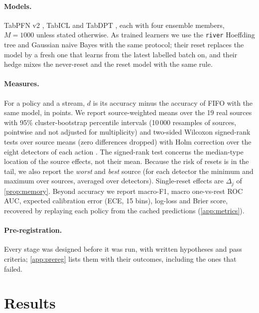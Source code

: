\documentclass[10pt]{article}
\theoremstyle{definition}
\theoremstyle{remark}
\begin{document}
\paragraph{Models.} TabPFN v2 \citep{hollmann2025tabpfn}, TabICL \citep{qu2025tabicl} and TabDPT \citep{ma2024tabdpt},
each with four ensemble members, $M=1000$ unless stated otherwise. As trained learners we use the \texttt{river}
Hoeffding tree \citep{domingos2000vfdt} and Gaussian naive Bayes with the same protocol; their reset replaces the model
by a fresh one that learns from the latest labelled batch on, and their hedge mixes the never-reset and the reset model
with the same rule.

\paragraph{Measures.} For a policy and a stream, $d$ is its accuracy minus the accuracy of FIFO with the same model,
in points. We report source-weighted means over the 19 real sources with 95\% cluster-bootstrap percentile intervals
(10\,000 resamples of sources, pointwise and not adjusted for multiplicity) and two-sided Wilcoxon signed-rank tests
over source means (zero differences dropped) with Holm correction over the eight detectors of each action
\citep{holm1979}. The signed-rank test concerns the median-type location of the source effects, not their mean. Because the risk of
resets is in the tail, we also report the \emph{worst} and \emph{best} source (for each detector the minimum and maximum
over sources, averaged over detectors). Single-reset effects are $\Delta_j$ of \cref{prop:memory}. Beyond accuracy we
report macro-F1, macro one-vs-rest ROC AUC, expected calibration error (ECE, 15 bins), log-loss and Brier score,
recovered by replaying each policy from the cached predictions (\cref{app:metrics}).

\paragraph{Pre-registration.} Every stage was designed before it was run, with written hypotheses and pass criteria;
\cref{app:prereg} lists them with their outcomes, including the ones that failed.

\section{Results}
\label{sec:results}
\end{document}
